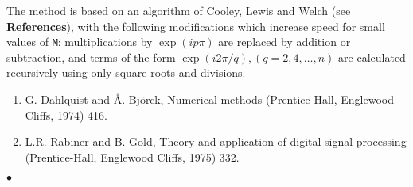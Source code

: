 \Method
The method is based on an algorithm of Cooley, Lewis and Welch
(see {\bf References}), with the following modifications
which increase speed for small values of {\tt M}: multiplications by
$\exp(ip\pi)$ are replaced by addition or subtraction, and terms of
the form $\exp(i2\pi/q),(q=2,4,\ldots,n)$ are calculated recursively
using only square roots and divisions.
\newpage
\Refer
\begin{enumerate}
\item  G. Dahlquist and \AA. Bj\"orck, Numerical methods
(Prentice-Hall, Englewood Cliffs, 1974) 416.
\item  L.R. Rabiner and B. Gold, Theory and application of
digital signal processing (Prentice-Hall, Englewood Cliffs, 1975) 332.
\end{enumerate}
$\bullet$
